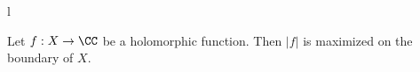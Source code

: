 l%

 
   \label{lem:maximumPrinciple}
    Let $f: X\to \CC$ be a holomorphic function. Then $|f|$ is maximized on the boundary of $X$.
 